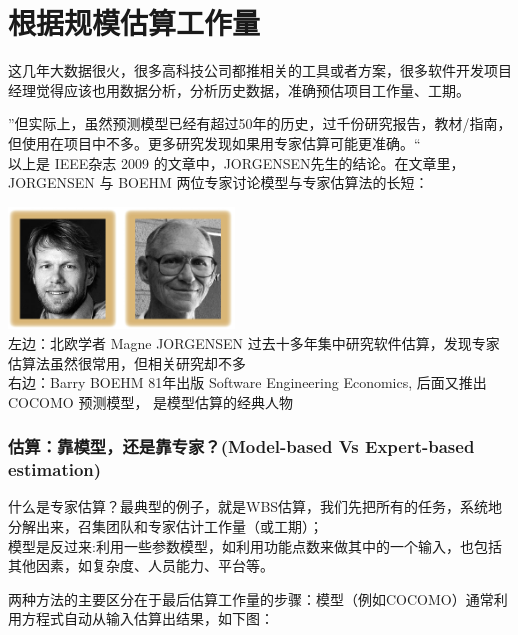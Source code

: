 \chapter{根据规模估算工作量} %

这几年大数据很火，很多高科技公司都推相关的工具或者方案，很多软件开发项目经理觉得应该也用数据分析，分析历史数据，准确预估项目工作量、工期。

''但实际上，虽然预测模型已经有超过50年的历史，过千份研究报告，教材/指南，但使用在项目中不多。更多研究发现如果用专家估算可能更准确。``\\
以上是 IEEE杂志 2009 的文章中，JORGENSEN先生的结论。在文章里，JORGENSEN
与 BOEHM 两位专家讨论模型与专家估算法的长短：


\includegraphics[width=6cm]{估算专家.png}\\

左边：北欧学者 Magne JORGENSEN
过去十多年集中研究软件估算，发现专家估算法虽然很常用，但相关研究却不多\\
右边：Barry BOEHM 81年出版 Software Engineering Economics, 后面又推出
COCOMO 预测模型， 是模型估算的经典人物

\hypertarget{ux4f30ux7b97ux9760ux6a21ux578bux8fd8ux662fux9760ux4e13ux5bb6model-based-vs-expert-based-estimation}{%
\subsection{估算：靠模型，还是靠专家？(Model-based Vs Expert-based
estimation)}\label{ux4f30ux7b97ux9760ux6a21ux578bux8fd8ux662fux9760ux4e13ux5bb6model-based-vs-expert-based-estimation}}

什么是专家估算？最典型的例子，就是WBS估算，我们先把所有的任务，系统地分解出来，召集团队和专家估计工作量（或工期）；\\
模型是反过来:利用一些参数模型，如利用功能点数来做其中的一个输入，也包括其他因素，如复杂度、人员能力、平台等。

两种方法的主要区分在于最后估算工作量的步骤：模型（例如COCOMO）通常利用方程式自动从输入估算出结果，如下图：

